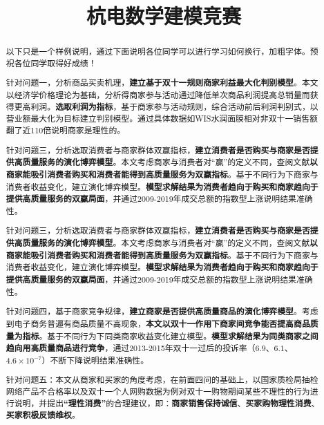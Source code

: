 \documentclass[UTF8]{ctexart}
\title{\textbf{杭电数学建模竞赛}}%
\date{}%
\author{}%
\begin{document}
\setcounter{page}{1}%
\maketitle
\vspace{-0.95cm}
\thispagestyle{fancy}   
\fancyhf{} %
\renewcommand{\headrulewidth}{0pt} %
\renewcommand{\abstractname}{\sihao 摘\quad 要} %
\begin{abstract}\xiaosihao
	\vspace{0.1cm}
	以下只是一个样例说明，通过下面说明各位同学可以进行学习如何换行，加粗字体。预祝各位同学取得好成绩！\par
	针对问题一，分析商品买卖机理，\textbf{建立基于双十一规则商家利益最大化判别模型}。本文以经济学价格理论为基础，分析得商家参与活动通过降低单次商品利润提高总销量而获得更高利润。\textbf{选取利润为指标}，基于商家参与活动规则，综合活动前后利润判别式，以营业额最大化为目标建立判别模型。通过具体数据如WIS水润面膜相对非双十一销售额翻了近110倍说明商家是理性的。\par
	针对问题三，分析选取消费者与商家群体双赢指标，\textbf{建立消费者是否购买与商家是否提供高质量服务的演化博弈模型}。本文考虑商家与消费者对“赢”的定义不同，查阅文献\textbf{以商家能吸引消费者购买和消费者能得到高质量服务为双赢指标}。基于不同行为下商家与消费者收益变化，建立演化博弈模型。\textbf{模型求解结果为消费者趋向于购买和商家趋向于提供高质量服务的双赢局面}，并通过2009-2019年成交总额的指数型上涨说明结果准确性。\par
		针对问题三，分析选取消费者与商家群体双赢指标，\textbf{建立消费者是否购买与商家是否提供高质量服务的演化博弈模型}。本文考虑商家与消费者对“赢”的定义不同，查阅文献\textbf{以商家能吸引消费者购买和消费者能得到高质量服务为双赢指标}。基于不同行为下商家与消费者收益变化，建立演化博弈模型。\textbf{模型求解结果为消费者趋向于购买和商家趋向于提供高质量服务的双赢局面}，并通过2009-2019年成交总额的指数型上涨说明结果准确性。\par
	针对问题四，基于商家竞争规律，\textbf{建立商家是否提供高质量商品的演化博弈模型}。考虑到电子商务普遍有商品质量不高现象，\textbf{本文以双十一作用下商家间竞争能否提高商品质量为指标}。基于不同行为下同类商家收益变化建立模型。\textbf{模型求解结果为同类商家之间趋向用高质量商品进行竞争}，通过2013-2015年双十一过后的投诉率（$6.9$、$6.1$、$4.6\times10^{-7}$）不断下降说明结果准确性。\par
	针对问题五：本文从商家和买家的角度考虑，在前面四问的基础上，以国家质检局抽检网络产品不合格率以及双十一个人网购数据为例对双十一购物期间某些不理性的行为进行说明，并提出\textbf{“理性消费”}的合理建议，即：\textbf{商家销售保持诚信}、\textbf{买家购物理性消费}、\textbf{买家积极反馈维权}。
	\\
	

\end{abstract}
\end{document}
